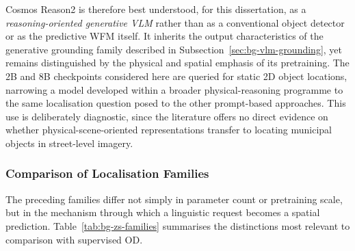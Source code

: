 Cosmos Reason2 is therefore best understood, for this dissertation, as a \emph{reasoning-oriented generative \gls{VLM}} rather than as a conventional object detector or as the predictive \gls{WFM} itself. It inherits the output characteristics of the generative grounding family described in Subsection~\ref{sec:bg-vlm-grounding}, yet remains distinguished by the physical and spatial emphasis of its pretraining. The 2B and 8B checkpoints considered here are queried for static 2D object locations, narrowing a model developed within a broader physical-reasoning programme to the same localisation question posed to the other prompt-based approaches. This use is deliberately diagnostic, since the literature offers no direct evidence on whether physical-scene-oriented representations transfer to locating municipal objects in street-level imagery.

\subsubsection{Comparison of Localisation Families}
\label{sec:bg-zs-comparison}
The preceding families differ not simply in parameter count or pretraining scale, but in the mechanism through which a linguistic request becomes a spatial prediction. Table~\ref{tab:bg-zs-families} summarises the distinctions most relevant to comparison with supervised \gls{OD}.

